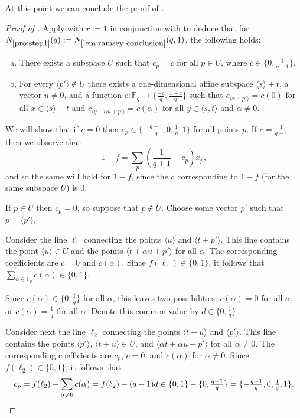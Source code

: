 \documentclass{article}
\theoremstyle{definition}
\providecommand{\FF}{\mathbb{F}}
\providecommand{\Nlist}{N_{\ref{pro:step1}}}
\providecommand{\Nramseyc}{N_{\ref{lem:ramsey-conclusion}}}
\begin{document}
At this point we can conclude the proof of .

\begin{proof}[Proof of ]
Apply  with $r := 1$ in conjunction with  to deduce that for $\Nlist(q) := \Nramseyc(q,1)$, the following holds:
\begin{enumerate}[(a)]
\item There exists a subspace $U$ such that $c_p = c$ for all $p \in U$, where $c \in \{0, \frac{1}{q+1}\}$.
\item For every $\langle p' \rangle \notin U$ there exists a one-dimensional affine subspace $\langle s \rangle + t$, a vector $u \neq 0$, and a function $c\colon \FF_q \to \{\frac{-c}{q}, \frac{1-c}{q}\}$ such that $c_{\langle x + p' \rangle} = c(0)$ for all $x \in \langle s \rangle + t$ and $c_{\langle y + \alpha u + p' \rangle} = c(\alpha)$ for all $y \in \langle s,t \rangle$ and $\alpha \neq 0$.
\end{enumerate}

We will show that if $c = 0$ then $c_p \in \{-\frac{q-1}{q},0,\frac{1}{q},1\}$ for all points $p$. If $c = \frac{1}{q+1}$ then we observe that
\[
 1 - f = \sum_p \left(\frac{1}{q+1} - c_p\right) x_p,
\]
and so the same will hold for $1 - f$, since the $c$ corresponding to $1 - f$ (for the same subspace $U$) is $0$.

\smallskip

If $p \in U$ then $c_p = 0$, so suppose that $p \notin U$. Choose some vector $p'$ such that $p = \langle p' \rangle$.

Consider the line $\ell_1$ connecting the points $\langle u \rangle$ and $\langle t+p' \rangle$. This line contains the point $\langle u \rangle \in U$ and the points $\langle t+\alpha u + p' \rangle$ for all $\alpha$. The corresponding coefficients are $c = 0$ and $c(\alpha)$. Since $f(\ell_1) \in \{0, 1\}$, it follows that $\sum_{\alpha \in \FF_q} c(\alpha) \in \{0, 1\}$.

Since $c(\alpha) \in \{0,\frac 1q\}$ for all $\alpha$, this leaves two possibilities: $c(\alpha) = 0$ for all $\alpha$, or $c(\alpha) = \frac1q$ for all $\alpha$. Denote this common value by $d \in \{0, \frac1q\}$.

Consider next the line $\ell_2$ connecting the points $\langle t+u \rangle$ and $\langle p' \rangle$. This line contains the points $\langle p' \rangle$, $\langle t+u \rangle \in U$, and $\langle \alpha t + \alpha u + p' \rangle$ for all $\alpha \neq 0$. The corresponding coefficients are $c_p$, $c = 0$, and $c(\alpha)$ for $\alpha \neq 0$. Since $f(\ell_2) \in \{0,1\}$, it follows that
\[
 c_p = f(\ell_2) - \sum_{\alpha \neq 0} c(\alpha) = f(\ell_2) - (q-1)d \in \{0,1\} - \{0,\tfrac{q-1}{q}\} = \{-\tfrac{q-1}{q},0,\tfrac{1}{q},1\}. \qedhere
\]
\end{proof}
\end{document}
